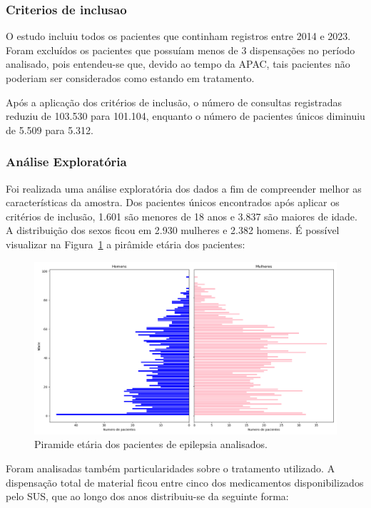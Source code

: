 \documentclass[article,a4paper,12pt,brazil,sumario=tradicional]{abntex2}
\begin{document}
\subsubsection{Criterios de inclusao}

O estudo incluiu todos os pacientes que continham registros entre 2014 e 2023. Foram excluídos os pacientes que possuíam menos de 3 dispensações no período analisado, pois entendeu-se que, devido ao tempo da APAC, tais pacientes não poderiam ser considerados como estando em tratamento.

Após a aplicação dos critérios de inclusão, o número de consultas registradas reduziu de 103.530 para 101.104, enquanto o número de pacientes únicos diminuiu de 5.509 para 5.312.

\subsubsection{Análise Exploratória}

Foi realizada uma análise exploratória dos dados a fim de compreender melhor as características da amostra. Dos pacientes únicos encontrados após aplicar os critérios de inclusão, 1.601 são menores de 18 anos e 3.837 são maiores de idade. A distribuição dos sexos ficou em 2.930 mulheres e 2.382 homens. É possível visualizar na Figura~\ref{fig:piramide_etaria_completa} a pirâmide etária dos pacientes:

\begin{figure}[ht!]
    \centering
    \includegraphics[width=1\textwidth]{piramide_etaria_completa.png}
    \caption{Piramide etária dos pacientes de epilepsia analisados.}
    \label{fig:piramide_etaria_completa}
\end{figure}

Foram analisadas também particularidades sobre o tratamento utilizado. A dispensação total de material ficou entre cinco dos medicamentos disponibilizados pelo SUS, que ao longo dos anos distribuiu-se da seguinte forma:
\end{document}
